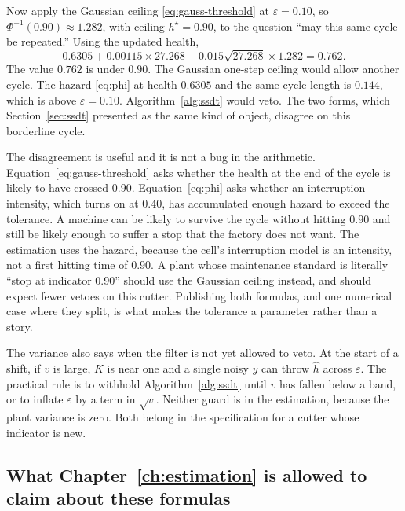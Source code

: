 Now apply the Gaussian ceiling \eqref{eq:gauss-threshold} at \(\varepsilon = 0.10\), so \(\Phi^{-1}(0.90) \approx 1.282\), with ceiling \(h^{\star} = 0.90\), to the question ``may this same cycle be repeated.'' Using the updated health,
\begin{equation}
0.6305 + 0.00115 \times 27.268 + 0.015 \sqrt{27.268} \times 1.282 = 0.762 .
\end{equation}
The value \(0.762\) is under \(0.90\). The Gaussian one-step ceiling would allow another cycle. The hazard \eqref{eq:phi} at health \(0.6305\) and the same cycle length is \(0.144\), which is above \(\varepsilon = 0.10\). Algorithm~\ref{alg:ssdt} would veto. The two forms, which Section~\ref{sec:ssdt} presented as the same kind of object, disagree on this borderline cycle.

The disagreement is useful and it is not a bug in the arithmetic. Equation~\eqref{eq:gauss-threshold} asks whether the health at the end of the cycle is likely to have crossed \(0.90\). Equation~\eqref{eq:phi} asks whether an interruption intensity, which turns on at \(0.40\), has accumulated enough hazard to exceed the tolerance. A machine can be likely to survive the cycle without hitting \(0.90\) and still be likely enough to suffer a stop that the factory does not want. The estimation uses the hazard, because the cell's interruption model is an intensity, not a first hitting time of \(0.90\). A plant whose maintenance standard is literally ``stop at indicator \(0.90\)'' should use the Gaussian ceiling instead, and should expect fewer vetoes on this cutter. Publishing both formulas, and one numerical case where they split, is what makes the tolerance a parameter rather than a story.

The variance also says when the filter is not yet allowed to veto. At the start of a shift, if \(v\) is large, \(K\) is near one and a single noisy \(y\) can throw \(\hat h\) across \(\varepsilon\). The practical rule is to withhold Algorithm~\ref{alg:ssdt} until \(v\) has fallen below a band, or to inflate \(\varepsilon\) by a term in \(\sqrt{v}\). Neither guard is in the estimation, because the plant variance is zero. Both belong in the specification for a cutter whose indicator is new.

\subsection{What Chapter~\ref{ch:estimation} is allowed to claim about these formulas}

